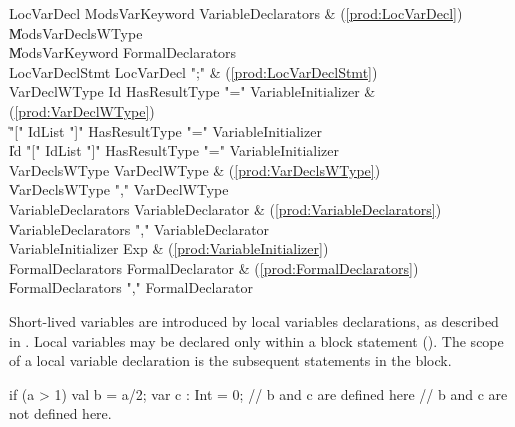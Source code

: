 \begin{bbgrammar}
          LocVarDecl \: Mods\opt VarKeyword VariableDeclarators & (\ref{prod:LocVarDecl}) \\
                     \| Mods\opt VarDeclsWType \\
                     \| Mods\opt VarKeyword FormalDeclarators \\
      LocVarDeclStmt \: LocVarDecl \xcd";" & (\ref{prod:LocVarDeclStmt}) \\
        VarDeclWType \: Id HasResultType \xcd"=" VariableInitializer & (\ref{prod:VarDeclWType}) \\
                     \| \xcd"[" IdList \xcd"]" HasResultType \xcd"=" VariableInitializer \\
                     \| Id \xcd"[" IdList \xcd"]" HasResultType \xcd"=" VariableInitializer \\
       VarDeclsWType \: VarDeclWType & (\ref{prod:VarDeclsWType}) \\
                     \| VarDeclsWType \xcd"," VarDeclWType \\
 VariableDeclarators \: VariableDeclarator & (\ref{prod:VariableDeclarators}) \\
                     \| VariableDeclarators \xcd"," VariableDeclarator \\
 VariableInitializer \: Exp & (\ref{prod:VariableInitializer}) \\
   FormalDeclarators \: FormalDeclarator & (\ref{prod:FormalDeclarators}) \\
                     \| FormalDeclarators \xcd"," FormalDeclarator \\
\end{bbgrammar}

Short-lived variables are introduced by local variables declarations, as
described in . Local variables may be declared only
within a block statement (). The scope of a local variable
declaration is the subsequent statements in the
block.   
\begin{xten}
  if (a > 1) {
     val b = a/2;
     var c : Int = 0;
     // b and c are defined here
  }
  // b and c are not defined here.
\end{xten}

